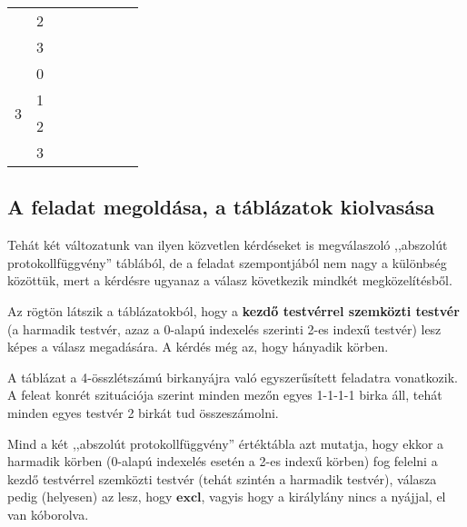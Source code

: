 \documentclass{article}
\newcommand{\blk}{\cellcolor{darkgray}}
\newcommand{\red}{\cellcolor{red!33}}
\newcommand{\grn}{\cellcolor{green!33}}
\newcommand{\just}[1]{\boxed{#1}}%
\newcommand{\incl}{\mathbf{incl}}
\newcommand{\excl}{\mathbf{excl}}
\begin{document}
\begin{table}[H]
\begin{tabular}{c|c|c|c|c|c|c|c|}
				               &  2                        &    \blk           & \blk           & \red\just\excl & \grn\just\incl & \blk           & \blk           \\\cline{2-8}
				               &  3                        &    \blk           & \blk           & \red\just\excl & \grn\just\incl & \blk           & \blk           \\\hline\hline
			\multirow{4}{*}{3}     &  0                        &    \blk           & \blk           & \blk           & \blk           & \blk           & \blk           \\\cline{2-8}
				               &  1                        &    \blk           & \blk           & \blk           & \blk           & \blk           & \blk           \\\cline{2-8}
				               &  2                        &    \blk           & \blk           & \blk           & \blk           & \blk           & \blk           \\\cline{2-8}
				               &  3                        &    \blk           & \blk           & \blk           & \blk           & \blk           & \blk           \\\hline
		\end{tabular}
	\end{table}

	\subsection{A feladat megoldása, a táblázatok kiolvasása}

	Tehát két változatunk van ilyen közvetlen kérdéseket is megválaszoló ,,abszolút protokollfüggvény'' táblából, de a feladat szempontjából nem nagy a különbség közöttük, mert a kérdésre ugyanaz a válasz következik mindkét megközelítésből.

	Az rögtön látszik a táblázatokból, hogy a \textbf{kezdő testvérrel szemközti testvér} (a harmadik testvér, azaz a 0-alapú indexelés szerinti 2-es indexű testvér) lesz képes a válasz megadására. A kérdés még az, hogy hányadik körben.

	A táblázat a 4-összlétszámú birkanyájra való egyszerűsített feladatra vonatkozik. A feleat konrét szituációja szerint minden mezőn egyes 1-1-1-1 birka áll, tehát minden egyes testvér 2 birkát tud összeszámolni.

	Mind a két ,,abszolút protokollfüggvény'' értéktábla azt mutatja, hogy ekkor a harmadik körben (0-alapú indexelés esetén a 2-es indexű körben) fog felelni a kezdő testvérrel szemközti testvér (tehát szintén a harmadik testvér), válasza pedig (helyesen) az lesz, hogy $\just\excl$, vagyis hogy a királylány nincs a nyájjal, el van kóborolva.
\end{document}
